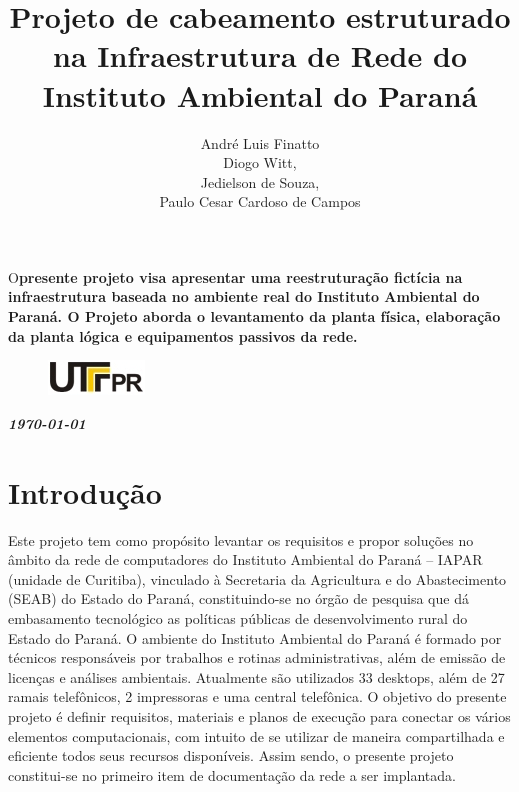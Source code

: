 \documentclass[	DIV=calc,%
							paper=a4,%
							fontsize=12pt,%
							onecolumn]{scrartcl}	 					%
\title{Projeto de cabeamento estruturado na Infraestrutura de Rede do Instituto Ambiental do Paraná}					%
\author{André Luis Finatto
	\\ Diogo Witt,
	\\ Jedielson de Souza,
	\\ Paulo Cesar Cardoso de Campos \vspace{1cm}}  	%
\date{}																				%
\newcommand{\initial}[1]{%
     \lettrine[lines=3,lhang=0.3,nindent=0em]{
     				\color{DarkGoldenrod}
     				{\textsf{#1}}}{}}
\begin{document}
\maketitle
\thispagestyle{fancy} 	
\thispagestyle{empty}		%





\initial{O}\textbf{presente projeto visa apresentar uma reestruturação fictícia na infraestrutura baseada no ambiente real do Instituto Ambiental do Paraná. O Projeto aborda o levantamento da planta física, elaboração da planta lógica e equipamentos passivos da rede.}


\begin{figure}
	\centering
	\includegraphics{utfpr}
\end{figure}

\vspace{2cm}
\centerline{\textit{\textbf{\today}}}

\clearpage
    \renewcommand*\listfigurename{Lista de figuras}
\listoffigures

\renewcommand*\listtablename{Lista de tabelas}
\listoftables




\clearpage
\renewcommand{\contentsname}{Sumário}
\tableofcontents
\clearpage

\section{Introdução}
\onehalfspacing %
Este projeto tem como propósito levantar os requisitos e propor soluções no âmbito da rede de computadores do Instituto Ambiental do Paraná – IAPAR (unidade de Curitiba),  vinculado à Secretaria da Agricultura e do Abastecimento (SEAB) do Estado do Paraná, constituindo-se no órgão de pesquisa que dá embasamento tecnológico as políticas públicas de desenvolvimento rural do Estado do Paraná.
O ambiente do Instituto Ambiental do Paraná é formado por técnicos responsáveis por trabalhos e rotinas administrativas, além de emissão de licenças e análises ambientais.
Atualmente são utilizados 33 desktops, além de 27 ramais telefônicos, 2 impressoras e uma central telefônica.
O objetivo do presente projeto é definir requisitos, materiais e planos de execução para conectar os vários elementos computacionais, com intuito de se utilizar de maneira compartilhada e eficiente todos seus recursos disponíveis. 
Assim sendo, o presente projeto constitui-se no primeiro item de documentação da rede a ser implantada.
\end{document}
